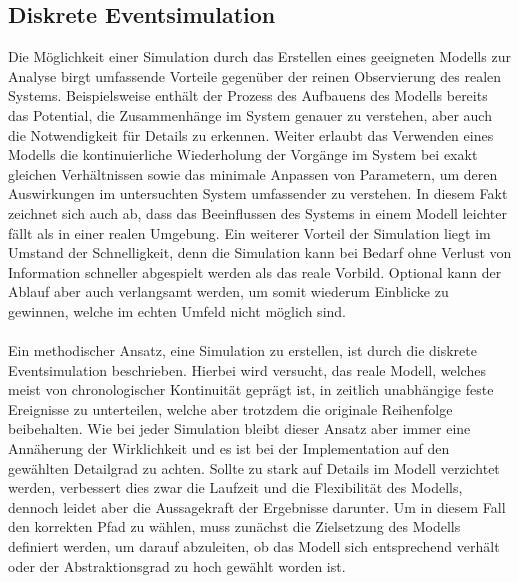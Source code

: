\subsection{Diskrete Eventsimulation}
Die Möglichkeit einer Simulation durch das Erstellen eines geeigneten Modells zur Analyse birgt umfassende Vorteile gegenüber der reinen Observierung des realen Systems. Beispielsweise enthält der Prozess des Aufbauens des Modells bereits das Potential, die Zusammenhänge im System genauer zu verstehen, aber auch die Notwendigkeit für Details zu erkennen. Weiter erlaubt das Verwenden eines Modells die kontinuierliche Wiederholung der Vorgänge im System bei exakt gleichen Verhältnissen sowie das minimale Anpassen von Parametern, um deren Auswirkungen im untersuchten System umfassender zu verstehen. In diesem Fakt zeichnet sich auch ab, dass das Beeinflussen des Systems in einem Modell leichter fällt als in einer realen Umgebung. Ein weiterer Vorteil der Simulation liegt im Umstand der Schnelligkeit, denn die Simulation kann bei Bedarf ohne Verlust von Information schneller abgespielt werden als das reale Vorbild. Optional kann der Ablauf aber auch verlangsamt werden, um somit wiederum Einblicke zu gewinnen, welche im echten Umfeld nicht möglich sind.
\\\\
Ein methodischer Ansatz, eine Simulation zu erstellen, ist durch die diskrete Eventsimulation beschrieben. Hierbei wird versucht, das reale Modell, welches meist von chronologischer Kontinuität geprägt ist, in zeitlich unabhängige feste Ereignisse zu unterteilen, welche aber trotzdem die originale Reihenfolge beibehalten. Wie bei jeder Simulation bleibt dieser Ansatz aber immer eine Annäherung der Wirklichkeit und es ist bei der Implementation auf den gewählten Detailgrad zu achten. Sollte zu stark auf Details im Modell verzichtet werden, verbessert dies zwar die Laufzeit und die Flexibilität des Modells, dennoch leidet aber die Aussagekraft der Ergebnisse darunter. Um in diesem Fall den korrekten Pfad zu wählen, muss zunächst die Zielsetzung des Modells definiert werden, um darauf abzuleiten, ob das Modell sich entsprechend verhält oder der Abstraktionsgrad zu hoch gewählt worden ist.

